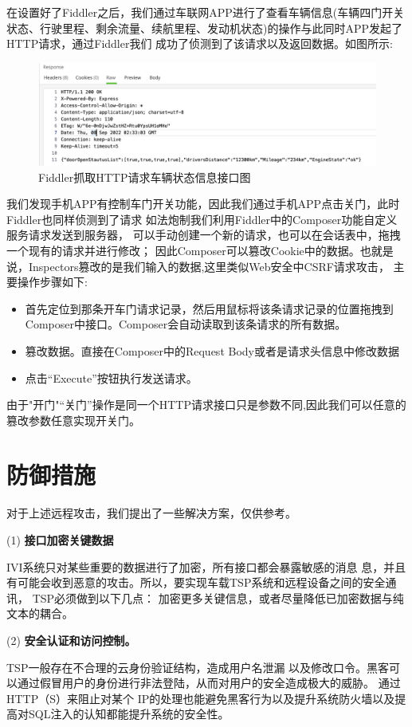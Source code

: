 在设置好了Fiddler之后，我们通过车联网APP进行了查看车辆信息(车辆四门开关状态、行驶里程、剩余流量、续航里程、发动机状态)的操作与此同时APP发起了HTTP请求，通过Fiddler我们
成功了侦测到了该请求以及返回数据。如图所示:
\begin{figure}
  \centering
  \includegraphics[scale=0.5]{resources/img/i26.png}
  \caption{Fiddler抓取HTTP请求车辆状态信息接口图}
\end{figure}
我们发现手机APP有控制车门开关功能，因此我们通过手机APP点击关门，此时Fiddler也同样侦测到了请求
如法炮制我们利用Fiddler中的Composer功能自定义服务请求发送到服务器，
可以手动创建一个新的请求，也可以在会话表中，拖拽一个现有的请求并进行修改；
因此Composer可以篡改Cookie中的数据。也就是说，Inspectors篡改的是我们输入的数据,这里类似Web安全中CSRF请求攻击\cite{blatz2007csrf}，
主要操作步骤如下:
\begin{itemize}
  \item 首先定位到那条开车门请求记录，然后用鼠标将该条请求记录的位置拖拽到Composer中接口。Composer会自动读取到该条请求的所有数据。
  \item 篡改数据。直接在Composer中的Request Body或者是请求头信息中修改数据
  \item 点击“Execute”按钮执行发送请求。
\end{itemize}
由于"开门"“关门”操作是同一个HTTP请求接口只是参数不同,因此我们可以任意的篡改参数任意实现开关门。
\section{防御措施}
对于上述远程攻击，我们提出了一些解决方案，仅供参考。

(1) \textbf{接口加密关键数据}

IVI系统只对某些重要的数据进行了加密，所有接口都会暴露敏感的消息
息，并且有可能会收到恶意的攻击。所以，要实现车载TSP系统和远程设备之间的安全通讯， TSP必须做到以下几点：
加密更多关键信息，或者尽量降低已加密数据与纯文本的耦合。

(2) \textbf{安全认证和访问控制。} 

TSP一般存在不合理的云身份验证结构，造成用户名泄漏
以及修改口令。黑客可以通过假冒用户的身份进行非法登陆，从而对用户的安全造成极大的威胁。
通过 HTTP（S）来阻止对某个 IP的处理也能避免黑客行为以及提升系统防火墙以及提高对SQL注入的认知都能提升系统的安全性。


